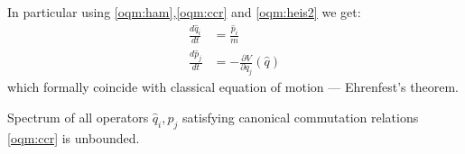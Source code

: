 In particular using \eqref{oqm:ham},\eqref{oqm:ccr} and \eqref{oqm:heis2} we get:
\begin{equation}
   \label {oqm:ehrenfest}
   \begin{split}
       \frac{d \hat q_i}{d t} &= \frac{\hat p_i}{m}\\
       \frac{d \hat p_j}{d t} &= - \frac{\partial V}{\partial q_j}(\hat q)
   \end{split}
\end{equation}
which formally coincide with classical equation of motion
--- Ehrenfest's theorem.
\begin{remark}
    Spectrum of all operators $ \hat q_i, \hat p_j$ satisfying
    canonical commutation relations \eqref{oqm:ccr} is unbounded.
\end{remark}  
